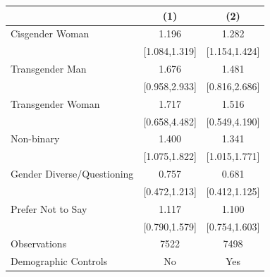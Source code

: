 \begin{tabular}{lcc}
\toprule
                    &\multicolumn{1}{c}{(1)}         &\multicolumn{1}{c}{(2)}         \\
\midrule
 Cisgender Woman&                 1.196\sym{***}&                 1.282\sym{***}\\
                    &         [1.084,1.319]         &         [1.154,1.424]         \\
\addlinespace
 Transgender Man&                 1.676\sym{*}  &                 1.481         \\
                    &         [0.958,2.933]         &         [0.816,2.686]         \\
\addlinespace
 Transgender Woman&                 1.717         &                 1.516         \\
                    &         [0.658,4.482]         &         [0.549,4.190]         \\
\addlinespace
 Non-binary&                 1.400\sym{**} &                 1.341\sym{**} \\
                    &         [1.075,1.822]         &         [1.015,1.771]         \\
\addlinespace
 Gender Diverse/Questioning&                 0.757         &                 0.681         \\
                    &         [0.472,1.213]         &         [0.412,1.125]         \\
\addlinespace
 Prefer Not to Say&                 1.117         &                 1.100         \\
                    &         [0.790,1.579]         &         [0.754,1.603]         \\
\midrule
Observations        &                  7522         &                  7498         \\
Demographic Controls&                    No         &                   Yes         \\
\bottomrule
\end{tabular}
